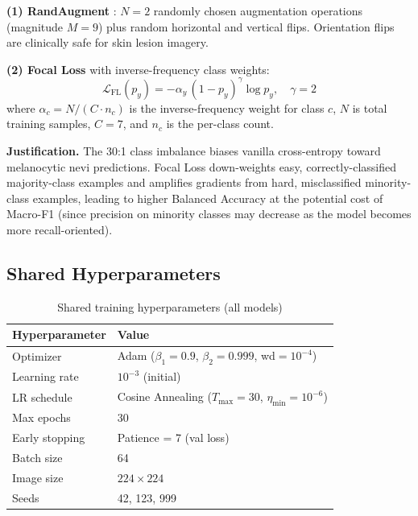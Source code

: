 \documentclass[conference]{IEEEtran}
\begin{document}
\textbf{(1) RandAugment} \cite{cubuk2020randaugment}: $N=2$
randomly chosen augmentation operations (magnitude $M=9$) plus
random horizontal and vertical flips. Orientation flips are
clinically safe for skin lesion imagery.

\textbf{(2) Focal Loss} \cite{lin2017focal} with inverse-frequency
class weights:
\begin{equation}
\mathcal{L}_\text{FL}(p_y) = -\alpha_y\,(1 - p_y)^\gamma \log p_y,
\quad \gamma = 2
\end{equation}
where $\alpha_c = N / (C \cdot n_c)$ is the inverse-frequency weight
for class $c$, $N$ is total training samples, $C=7$, and $n_c$ is
the per-class count.

\textbf{Justification.} The 30:1 class imbalance biases vanilla
cross-entropy toward melanocytic nevi predictions. Focal Loss
down-weights easy, correctly-classified majority-class examples and
amplifies gradients from hard, misclassified minority-class examples,
leading to higher Balanced Accuracy at the potential cost of
Macro-F1 (since precision on minority classes may decrease as the
model becomes more recall-oriented).

\subsection{Shared Hyperparameters}

\begin{table}[ht]
\centering
\caption{Shared training hyperparameters (all models)}
\label{tab:hparams}
\begin{tabular}{ll}
\toprule
\textbf{Hyperparameter} & \textbf{Value} \\
\midrule
Optimizer        & Adam ($\beta_1{=}0.9$, $\beta_2{=}0.999$, wd$=10^{-4}$) \\
Learning rate    & $10^{-3}$ (initial) \\
LR schedule      & Cosine Annealing ($T_\text{max}{=}30$, $\eta_\text{min}{=}10^{-6}$) \\
Max epochs       & 30 \\
Early stopping   & Patience = 7 (val loss) \\
Batch size       & 64 \\
Image size       & $224 \times 224$ \\
Seeds            & 42, 123, 999 \\
\bottomrule
\end{tabular}
\end{table}
\end{document}
